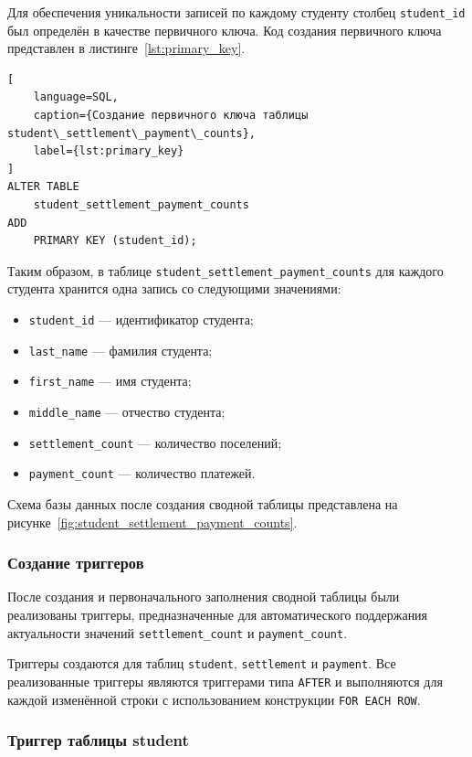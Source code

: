Для обеспечения уникальности записей по каждому студенту столбец \texttt{student\_id} был определён в качестве первичного ключа. Код создания первичного ключа представлен в листинге~\ref{lst:primary_key}.

\begin{lstlisting}[
    language=SQL,
    caption={Создание первичного ключа таблицы student\_settlement\_payment\_counts},
    label={lst:primary_key}
]
ALTER TABLE
    student_settlement_payment_counts
ADD
    PRIMARY KEY (student_id);
\end{lstlisting}

Таким образом, в таблице \texttt{student\_settlement\_payment\_counts} для каждого студента хранится одна запись со следующими значениями:

\begin{itemize}
    \item \texttt{student\_id} --- идентификатор студента;
    \item \texttt{last\_name} --- фамилия студента;
    \item \texttt{first\_name} --- имя студента;
    \item \texttt{middle\_name} --- отчество студента;
    \item \texttt{settlement\_count} --- количество поселений;
    \item \texttt{payment\_count} --- количество платежей.
\end{itemize}

Схема базы данных после создания сводной таблицы представлена на рисунке~\ref{fig:student_settlement_payment_counts}.

\subsubsection{Создание триггеров}

После создания и первоначального заполнения сводной таблицы были реализованы триггеры, предназначенные для автоматического поддержания актуальности значений \texttt{settlement\_count} и \texttt{payment\_count}.

Триггеры создаются для таблиц \texttt{student}, \texttt{settlement} и \texttt{payment}. Все реализованные триггеры являются триггерами типа \texttt{AFTER} и выполняются для каждой изменённой строки с использованием конструкции \texttt{FOR EACH ROW}.

\subsubsection{Триггер таблицы student}

